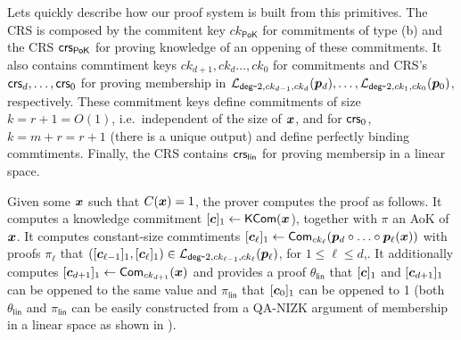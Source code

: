 Lets quickly describe how our proof system is built from this primitives. The CRS is composed by the commitent key $ck_\mathsf{PoK}$ for commitments of type (b) and the CRS $\mathsf{crs}_\mathsf{PoK}$ for proving knowledge of an oppening of these commitments. It also contains commtiment keys $ck_{d+1},ck_d\ldots,ck_0$ for commitments and CRS's $\mathsf{crs}_d,\ldots,\mathsf{crs}_0$ for proving membership in $\mathcal{L}_{\mathsf{deg}\mbox{-}2,ck_{d-1},ck_d}({\boldsymbol{p}}_d),\allowbreak\ldots,\allowbreak\mathcal{L}_{\mathsf{deg}\mbox{-}2,ck_1,ck_0}({\boldsymbol{p}}_0)$, respectively. These commitment keys define commitments of size $k=r+1=O(1)$, i.e.~independent of the size of ${\boldsymbol{x}}$, and for $\mathsf{crs}_0$, $k=m+r=r+1$ (there is a unique output) and define perfectly binding commtiments. Finally, the CRS contains $\mathsf{crs}_\mathsf{lin}$ for proving membersip in a linear space.

Given some ${\boldsymbol{x}}$ such that $C({\boldsymbol{x}})= 1$, the prover computes the proof as follows. It computes a knowledge commitment $[{\boldsymbol{c}}]_1\gets\mathsf{KCom}({\boldsymbol{x}}$), together with $\pi$ an AoK of ${\boldsymbol{x}}$. It computes constant-size commtiments $[{\boldsymbol{c}}_\ell]_1\gets\mathsf{Com}_{ck_\ell}({\boldsymbol{p}}_d\circ\ldots\circ{\boldsymbol{p}}_\ell({\boldsymbol{x}}))$  with proofs $\pi_\ell$ that $([{\boldsymbol{c}}_{\ell-1}]_1,[{\boldsymbol{c}}_\ell]_1)\in\mathcal{L}_{\mathsf{deg}\mbox{-}2,ck_{\ell-1},ck_\ell}({\boldsymbol{p}}_\ell)$, for $1\leq \ell\leq d$,. It additionally computes $[{\boldsymbol{c}}_{d+1}]_1\gets\mathsf{Com}_{ck_{d+1}}({\boldsymbol{x}})$ and provides a proof $\theta_\mathsf{lin}$ that $[{\boldsymbol{c}}]_1$ and $[{\boldsymbol{c}}_{d+1}]_1$ can be oppened to the same value and $\pi_\mathsf{lin}$ that $[{\boldsymbol{c}}_0]_1$  can be oppened to 1 (both $\theta_\mathsf{lin}$ and $\pi_\mathsf{lin}$ can be easily constructed from a QA-NIZK argument of membership in a linear space as shown in \cite{AC:GonHevRaf15}).

